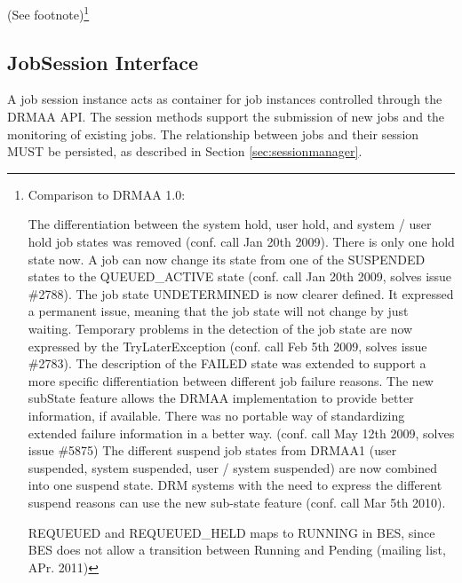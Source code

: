 \documentclass{article}
\newcommand{\rat}[1]{ {\tiny(See footnote)}\footnote{#1} }
\begin{document}
\rat{
Comparison to DRMAA 1.0: 

The differentiation between the system hold, user hold, and system / user hold job states was removed (conf. call Jan 20th 2009). There is only one hold state now. A job can now change its state from one of the SUSPENDED states to the QUEUED\_ACTIVE state (conf. call Jan 20th 2009, solves issue \#2788). The job state UNDETERMINED is now clearer defined. It expressed a permanent issue, meaning that the job state will not change by just waiting. Temporary problems in the detection of the job state are now expressed by the TryLaterException (conf. call Feb 5th 2009, solves issue \#2783). The description of the FAILED state was extended to support a more specific differentiation between different job failure reasons. The new subState feature allows the DRMAA implementation to provide better information, if available. There was no portable way of standardizing extended failure information in a better way. (conf. call May 12th 2009, solves issue \#5875) The different suspend job states from DRMAA1 (user suspended, system suspended, user / system suspended) are now combined into one suspend state. DRM systems with the need to express the different suspend reasons can use the new sub-state feature (conf. call Mar 5th 2010).

REQUEUED and REQUEUED\_HELD maps to RUNNING in BES, since BES does not allow a transition between Running and Pending (mailing list, APr. 2011)
}	

\subsection{JobSession Interface}
\label{sec:jobsession}

A job session instance acts as container for job instances controlled through the DRMAA API. The session methods support the submission of new jobs and the monitoring of existing jobs. The relationship between jobs and their session MUST be persisted, as described in Section \ref{sec:sessionmanager}. 


\end{document}
